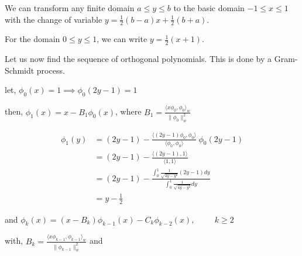 \documentclass[a4paper,11pt]{report}
\begin{document}
\begin{enumerate}
\begin{itemize}
    We can transform any finite domain $a \le y \le b$ to the basic domain 
    $-1 \le x \le 1$ with the change of variable $y = \displaystyle \frac{1}{2}
    (b - a)x + \frac{1}{2} (b + a)$.

    For the domain $0 \le y \le 1$, we can write $y = \displaystyle \frac{1}{2}
    (x + 1)$.
    
    Let us now find the sequence of orthogonal polynomials. This is done by a 
    Gram-Schmidt process. 

    let, $\phi_{0}(x) = 1 \implies \phi_{0}(2y-1) = 1$

    then, $\phi_{1}(x) = x - B_{1} \phi_{0}(x)$, where $B_{1} = \displaystyle 
    \frac{\langle x \phi_{0}, \phi_{0} \rangle_{w}}{\| \phi_{0} \|_{w}^{2}}$
    
    \begin{equation*}
    \begin{aligned}
    \phi_{1}(y) &= (2y-1) - \displaystyle \frac{\langle (2y-1) \phi_{0}, 
    \phi_{0} \rangle}{\langle \phi_{0}, \phi_{0} \rangle}\ \phi_{0}(2y-1) \\
                &= (2y-1) - \displaystyle \frac{\langle (2y-1), 1 \rangle}
    {\langle 1, 1 \rangle} \\
                &= (2y-1) - \displaystyle \frac{\displaystyle\int_{0}^{1} 
    \frac{1}{\sqrt{4y-y^2}} (2y-1) dy}{\displaystyle\int_{0}^{1} 
    \frac{1}{\sqrt{4y-y^2}} dy} \\
                &= y - \frac{1}{2}
    \end{aligned}
    \end{equation*}

    and $\phi_{k}(x) = (x - B_{k}) \phi_{k-1}(x) - C_{k} \phi_{k-2}(x), 
    \hspace{1cm} k \ge 2$ 

    with, $B_{k} = \displaystyle \frac{\langle x \phi_{k-1}, \phi_{k-1} 
    \rangle_{w}}{\| \phi_{k-1} \|_{w}^{2}}$ and


\end{itemize}
\end{enumerate}
\end{document}
